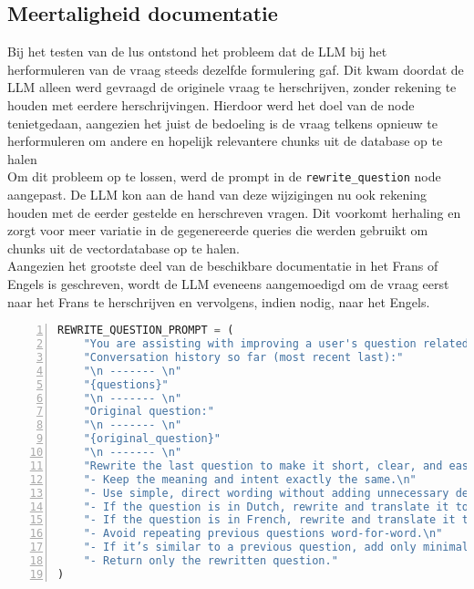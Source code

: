 \subsection{Meertaligheid documentatie}
Bij het testen van de lus ontstond het probleem dat de LLM bij het herformuleren van de vraag steeds dezelfde formulering gaf. Dit kwam doordat de LLM alleen werd gevraagd de originele vraag te herschrijven, zonder rekening te houden met eerdere herschrijvingen. Hierdoor werd het doel van de node tenietgedaan, aangezien het juist de bedoeling is de vraag telkens opnieuw te herformuleren om andere en hopelijk relevantere chunks uit de database op te halen 
\\[1em]
Om dit probleem op te lossen, werd de prompt in de \verb|rewrite_question| node aangepast. De LLM kon aan de hand van deze wijzigingen nu ook rekening houden met de eerder gestelde en herschreven vragen. Dit voorkomt herhaling en zorgt voor meer variatie in de gegenereerde queries die werden gebruikt om chunks uit de vectordatabase op te halen.
\\[1em]
Aangezien het grootste deel van de beschikbare documentatie in het Frans of Engels is geschreven, wordt de LLM eveneens aangemoedigd om de vraag eerst naar het Frans te herschrijven en vervolgens, indien nodig, naar het Engels.

\begin{lstlisting}[basicstyle=\small, frame=single, breaklines=true, postbreak=\mbox{\textcolor{red}{$\hookrightarrow$}\space}, escapeinside ={\%,}, escapechar={!}, numbers=left, language=Python, caption=Prompt om vraag te herschrijven]
REWRITE_QUESTION_PROMPT = (
    "You are assisting with improving a user's question related to Myminfin IT support.\n"
    "Conversation history so far (most recent last):"
    "\n ------- \n"
    "{questions}"
    "\n ------- \n"
    "Original question:"
    "\n ------- \n"
    "{original_question}"
    "\n ------- \n"
    "Rewrite the last question to make it short, clear, and easy to match with relevant documents in a vector database.\n"
    "- Keep the meaning and intent exactly the same.\n"
    "- Use simple, direct wording without adding unnecessary details.\n"
    "- If the question is in Dutch, rewrite and translate it to French.\n"
    "- If the question is in French, rewrite and translate it to English.\n"
    "- Avoid repeating previous questions word-for-word.\n"
    "- If it’s similar to a previous question, add only minimal context needed for distinction.\n"
    "- Return only the rewritten question."
)
\end{lstlisting}
